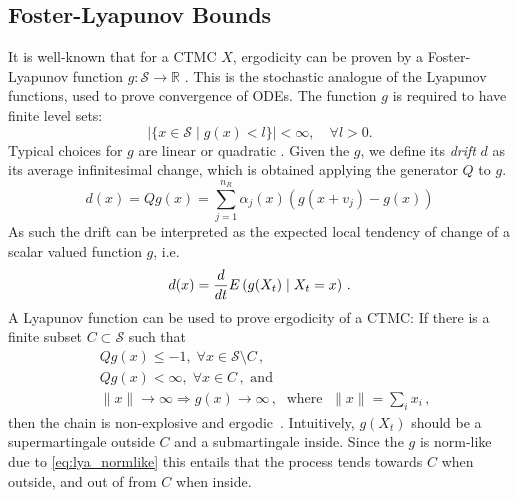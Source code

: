\subsection{Foster-Lyapunov Bounds}\label{sec:statagg:lyapunov}
It is well-known that for a \ac{CTMC} $X$, ergodicity can be proven by a Foster-Lyapunov
 function $g:\mathcal{S}\to\mathbb{R}$ \parencite{meyn1993stability,dayar2011bounding}.
 This is the stochastic analogue of the Lyapunov functions, used to prove convergence of \acp{ODE}\@.
The function $g$ is required to have finite level sets:
\[
    \left|\{x\in\mathcal{S} \mid g(x) < l\}\right|<\infty,\quad \forall l > 0.
\]
Typical choices for $g$ are linear \parencite{gupta2014scalable,milias2014optimization} or quadratic \parencite{spieler2014numerical}.
Given the $g$, we define its \emph{drift} $d$ as its average infinitesimal change, which is obtained applying the generator $Q$ to $g$.%
\begin{equation}\label{eq:drift}
    d(x) = Qg(x) = \sum_{j=1}^{n_R} \alpha_j(x) (g(x+v_j) -  g(x))
\end{equation}
As such the drift can be interpreted as the expected local tendency of change of a scalar valued function $g$, i.e.\
\[
    d(x) = \frac{d}{dt}{E}\left(g(X_t)\mid X_t = x\right)\,.
\]
A Lyapunov function can be used to prove ergodicity of a \ac{CTMC}: If there is a finite subset $C\subset\mathcal{S}$ such that
\begin{align}
    &Qg(x)\leq -1,\; \forall x\in\mathcal{S}\setminus C\,,\label{eq:neg_outside}\\
    &Qg(x)< \infty,\; \forall x\in C\,, \text{ and}\label{eq:pos_inside}\\
    &\lVert x\rVert\to\infty \Rightarrow g(x)\to\infty\,,\;\text{ where }\;\lVert x\rVert=\sum_i x_i\,,\label{eq:lya_normlike}
\end{align}
then the chain is non-explosive and ergodic~\parencite{milias2014optimization,tweedie_1975}.
Intuitively, $g(X_t)$ should be a supermartingale outside $C$ and a submartingale inside.
Since the $g$ is norm-like due to \eqref{eq:lya_normlike} this entails that the process
tends towards $C$ when outside, and out of from $C$ when inside.


